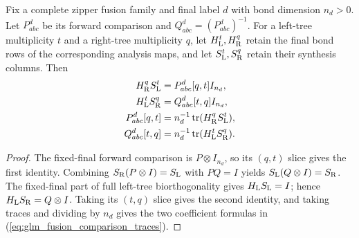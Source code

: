 \begin{lemma}
    \leanok
    \label{thm:glm_fusion_comparison_traces}
    Fix a complete zipper fusion family and final label $d$ with bond
    dimension $n_d>0$. Let $P_{abc}^{d}$ be its forward comparison and
    $Q_{abc}^{d}=(P_{abc}^{d})^{-1}$. For a left-tree multiplicity $t$ and
    a right-tree multiplicity $q$, let $H_{\rm L}^{t},H_{\rm R}^{q}$
    retain the final bond rows of the corresponding analysis maps, and
    let $S_{\rm L}^{t},S_{\rm R}^{q}$ retain their synthesis columns.
    Then
    \begin{align}
        H_{\rm R}^{q}S_{\rm L}^{t}
         & =P_{abc}^{d}[q,t]I_{n_d},\notag                               \\
        H_{\rm L}^{t}S_{\rm R}^{q}
         & =Q_{abc}^{d}[t,q]I_{n_d},\notag                               \\
        P_{abc}^{d}[q,t]
         & =n_d^{-1}\operatorname{tr}(H_{\rm R}^{q}S_{\rm L}^{t}),\notag \\
        Q_{abc}^{d}[t,q]
         & =n_d^{-1}\operatorname{tr}(H_{\rm L}^{t}S_{\rm R}^{q}).
        \label{eq:glm_fusion_comparison_traces}
    \end{align}
\end{lemma}
\begin{proof}
    \leanok
    The fixed-final forward comparison is $P\otimes I_{n_d}$, so its
    $(q,t)$ slice gives the first identity. Combining
    $S_{\rm R}(P\otimes I)=S_{\rm L}$ with $PQ=I$ yields
    $S_{\rm L}(Q\otimes I)=S_{\rm R}$. The fixed-final part of full
    left-tree biorthogonality gives $H_{\rm L}S_{\rm L}=I$; hence
    $H_{\rm L}S_{\rm R}=Q\otimes I$. Taking its $(t,q)$ slice gives
    the second identity, and taking traces and dividing by $n_d$ gives the
    two coefficient formulas in (\ref{eq:glm_fusion_comparison_traces}).
\end{proof}

